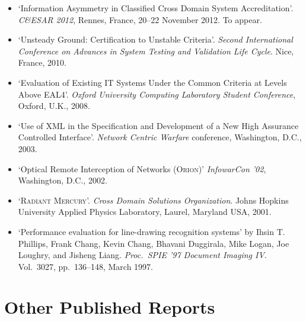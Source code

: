 \documentclass[letterpaper]{article}
\begin{document}
\begin{itemize}
	\item `Information Asymmetry in Classified Cross Domain System Accreditation'.
		\emph{C\&ESAR 2012}, Rennes, France, 20--22 November 2012.  To appear.

	\item `Unsteady Ground: Certification to Unstable Criteria'.
		\emph{Second International Conference on Advances in System Testing
		and Validation Life Cycle}. Nice, France, 2010. 

	\item `Evaluation of Existing IT Systems Under the Common Criteria
		at Levels Above EAL4'. \emph{Oxford University
		Computing Laboratory Student Conference}, Oxford, U.K., 2008.

    \item `Use of XML in the Specification and Development of a New High
		Assurance Controlled Interface'. \emph{Network Centric Warfare} conference,
		Washington, D.C., 2003.

    \item `Optical Remote Interception of Networks (\textsc{Orion})'
		\emph{InfowarCon '02}, Washington, D.C., 2002.

    \item `\textsc{Radiant Mercury}'. \emph{Cross Domain Solutions
		Organization}. Johns Hopkins University Applied Physics Laboratory,
		Laurel, Maryland USA, 2001.

    \item `Performance evaluation for line-drawing recognition systems'
		by Ihsin T. Phillips, Frank Chang, Kevin Chang, Bhavani Duggirala,
		Mike Logan, Joe Loughry, and Jisheng Liang. \emph{Proc.\ SPIE '97
		Document Imaging IV}. Vol.\ 3027, pp.\ 136--148, March 1997.
\end{itemize}

\section*{Other Published Reports} %
\end{document}
